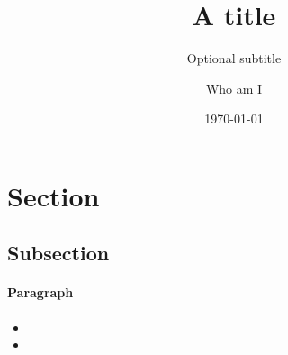 \documentclass[nochapters]{hpman}
\title{A title}
\subtitle{Optional subtitle}
\author{Who am I}
\date{\today}
\begin{document}
\begin{abstract}
\lipsum[1]
\end{abstract}
\maketitle

\section{Section}

\subsection{Subsection}

\lipsum[1-2]

\paragraph{Paragraph}

\lipsum[3]

\begin{itemize}
\item \lipsum[4]
\item \lipsum[5]
\end{itemize}

\lipsum[6-10]
\end{document}
